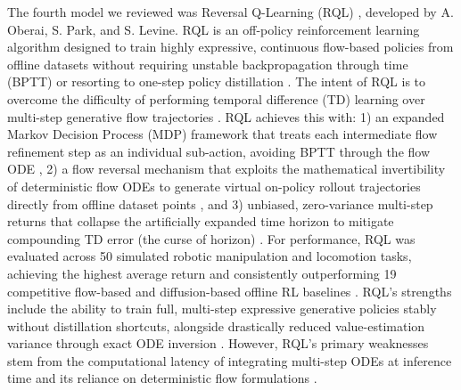 \documentclass[conference]{IEEEtran}
\begin{document}
The fourth model we reviewed was Reversal Q-Learning (RQL) \cite{b11}, developed by A. Oberai, S. Park, and
S. Levine. RQL is an off-policy reinforcement learning algorithm designed to train highly expressive, continuous
flow-based policies from offline datasets without requiring unstable backpropagation through time (BPTT) or
resorting to one-step policy distillation \cite{b11}. The intent of RQL is to overcome the difficulty of performing
temporal difference (TD) learning over multi-step generative flow trajectories \cite{b11}. RQL achieves this with:
1) an expanded Markov Decision Process (MDP) framework that treats each intermediate flow refinement step as an
individual sub-action, avoiding BPTT through the flow ODE \cite{b11}, 2) a flow reversal mechanism that exploits
the mathematical invertibility of deterministic flow ODEs to generate virtual on-policy rollout trajectories
directly from offline dataset points \cite{b11}, and 3) unbiased, zero-variance multi-step returns that collapse
the artificially expanded time horizon to mitigate compounding TD error (the curse of horizon) \cite{b11}.
For performance, RQL was evaluated across 50 simulated robotic manipulation and locomotion tasks, achieving
the highest average return and consistently outperforming 19 competitive flow-based and diffusion-based offline
RL baselines \cite{b11}. RQL's strengths include the ability to train full, multi-step expressive generative
policies stably without distillation shortcuts, alongside drastically reduced value-estimation variance through
exact ODE inversion \cite{b11}. However, RQL's primary weaknesses stem from the computational latency of integrating
multi-step ODEs at inference time and its reliance on deterministic flow formulations \cite{b11}.
\end{document}
